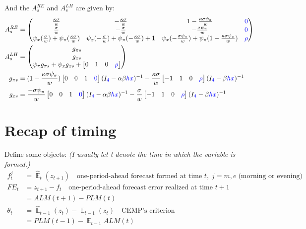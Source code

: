 \documentclass[11pt]{article}
\renewcommand{\[}{\begin{equation}}
\renewcommand{\]}{\end{equation}}
\DeclareMathOperator{\E}{\mathbb{E}}
\begin{document}
And the $A^{RE}_s$ and $A^{LH}_s$ are given by:
\begin{align}
A_s^{RE} &= \begin{pmatrix}   \frac{\kappa\sigma}{w}  &-\frac{\kappa\sigma}{w}  & 1-\frac{\kappa\sigma\psi_{\pi}}{w} & \textcolor{blue}{0}\\
 \frac{ \sigma}{w} &  -\frac{\sigma}{w} & -\frac{\sigma\psi_{\pi}}{w} & \textcolor{blue}{0}\\ 
 \psi_x( \frac{\sigma}{w}) + \psi_{\pi}( \frac{\kappa\sigma}{w}) & \psi_x(- \frac{\sigma}{w}) + \psi_{\pi}(- \frac{\kappa\sigma}{w}) +1 &  \psi_x(-\frac{\sigma\psi_{\pi}}{w}) + \psi_{\pi}( 1-\frac{\kappa\sigma\psi_{\pi}}{w}) & \textcolor{blue}{\rho}\end{pmatrix}  
\\
 A_s^{LH} & = \begin{pmatrix} g_{\pi s} \\ g_{x s} \\ \psi_{\pi}g_{\pi s} + \psi_xg_{x s} + \begin{bmatrix} 0 & 1& 0 & \textcolor{blue}{\rho}\end{bmatrix}
\end{pmatrix} \\
g_{\pi s} & = (1-\frac{\kappa\sigma\psi_{\pi}}{w} )\begin{bmatrix} 0&0&1 & \textcolor{blue}{0}\end{bmatrix} (I_{\textcolor{blue}{4}} - \alpha\beta \textcolor{blue}{hx})^{-1} -\frac{\kappa\sigma}{w}\begin{bmatrix} -1&1&0 & \textcolor{blue}{\rho} \end{bmatrix} (I_{\textcolor{blue}{4}} -\beta \textcolor{blue}{hx})^{-1}\\
g_{x s} & =  \frac{-\sigma\psi_{\pi}}{w} \begin{bmatrix} 0&0&1& \textcolor{blue}{0} \end{bmatrix}(I_{\textcolor{blue}{4}} - \alpha\beta \textcolor{blue}{hx})^{-1}  -\frac{\sigma}{w}\begin{bmatrix} -1&1&0 & \textcolor{blue}{\rho}\end{bmatrix}(I_{\textcolor{blue}{4}} -\beta \textcolor{blue}{hx})^{-1}
\end{align}

\clearpage
\section{Recap of timing}

Define some objects: \emph{(I usually let t denote the time in which the variable is formed.)}
\begin{align}
f^j_t &= \hat{\E}_t(z_{t+1}) \quad \text{one-period-ahead forecast formed at time } t, \; j=m,e \; \text{(morning or evening)} \\
FE_t & = z_{t+1}-f_t \quad \text{one-period-ahead forecast error realized at time } t+1 \\
& = ALM(t+1) - PLM(t) \\
\theta_t &=  \hat{\E}_{t-1}(z_{t}) - \E_{t-1}(z_{t}) \quad \text{CEMP's criterion} \\
& = PLM(t-1) - \E_{t-1}ALM(t)
\end{align}
\end{document}
